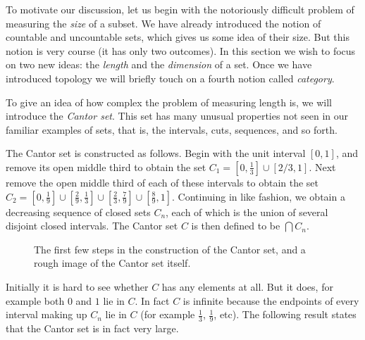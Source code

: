 \documentclass[11pt,oneside]{amsbook}
\theoremstyle{definition}
\theoremstyle{plain}
\theoremstyle{definition}
\theoremstyle{remark}
\numberwithin{equation}{section}
\numberwithin{figure}{section}
\begin{document}
To motivate our discussion, let us begin with the notoriously difficult problem of measuring the \emph{size} of a subset. We have already introduced the notion of countable and uncountable sets, which gives us some idea of their size. But this notion is very course (it has only two outcomes). In this section we wish to focus on two new ideas: the \emph{length} and the \emph{dimension} of a set. Once we have introduced topology we will briefly touch on a fourth notion called \emph{category}.

To give an idea of how complex the problem of measuring length is, we will introduce the \emph{Cantor set}. This set has many unusual properties not seen in our familiar examples of sets, that is, the intervals, cuts, sequences, and so forth.

The Cantor set is constructed as follows. Begin with the unit interval $[0,1]$, and remove its open middle third to obtain the set $C_1=[0,\frac13]\cup[2/3,1]$. Next remove the open middle third of each of these intervals to obtain the set $C_2=[0,\frac19]\cup[\frac29,\frac13]
\cup[\frac23,\frac79]\cup[\frac89,1]$. Continuing in like fashion, we obtain a decreasing sequence of closed sets $C_n$, each of which is the union of several disjoint closed intervals. The Cantor set $C$ is then defined to be $\bigcap C_n$.

\begin{figure}[h]
\begin{center}
\end{center}
\caption{The first few steps in the construction of the Cantor set, and a rough image of the Cantor set itself.\label{fig:cantor-set}}
\end{figure}

Initially it is hard to see whether $C$ has any elements at all. But it does, for example both $0$ and $1$ lie in $C$. In fact $C$ is infinite because the endpoints of every interval making up $C_n$ lie in $C$ (for example $\frac13$, $\frac19$, etc). The following result states that the Cantor set is in fact very large.
\end{document}

